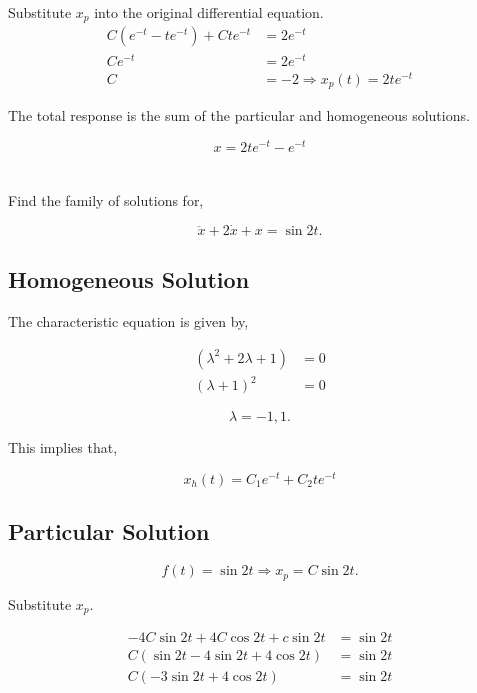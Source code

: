 \documentclass[12pt]{article}
\numberwithin{equation}{section}
\begin{document}
  Substitute $ x_p $ into the original differential equation.
    \begin{align}
      C \left( e^{-t} -te^{-t} \right) + Ct e^{-t} &= 2e^{-t} \\
      Ce^{-t} &= 2e^{-t} \\
      C &= -2 \Rightarrow x_p(t) = 2te^{-t}
    \end{align}

  The total response is the sum of the particular and homogeneous solutions.

  \begin{equation}
    x = 2te^{-t} - e^{-t}
  \end{equation}

  \section{}

  Find the family of solutions for,

  \[
      \ddot x + 2 \dot x + x = \sin2t
    .\]

  \subsection{Homogeneous Solution}

  The characteristic equation is given by,

  \begin{align}
    \left( \lambda ^2 + 2 \lambda + 1 \right) &= 0 \\
    (\lambda + 1) ^2 &= 0
  \end{align}

  \[
      \lambda = -1, 1
    .\]

  This implies that,

  \begin{equation}
    x_h(t) = C_1 e^{-t} + C_2 te^{-t}
  \end{equation}

  \subsection{Particular Solution}

  \[
      f(t) = \sin2t \Rightarrow x_p = C\sin2t
    .\]

  Substitute $ x_p. $

  \begin{align}
    -4C\sin2t + 4C\cos2t +c\sin2t &= \sin2t \\
    C \left( \sin2t - 4\sin2t + 4\cos2t \right) &= \sin2t \\
    C \left( -3\sin2t + 4\cos2t \right) &= \sin2t \\
  \end{align}
\end{document}
